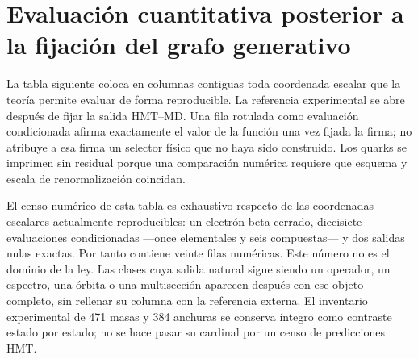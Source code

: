 \section{Evaluación cuantitativa posterior a la fijación del grafo generativo}
La tabla siguiente coloca en columnas contiguas toda coordenada escalar que la teoría permite evaluar de forma reproducible. La referencia experimental se abre después de fijar la salida HMT--MD. Una fila rotulada como evaluación condicionada afirma exactamente el valor de la función una vez fijada la firma; no atribuye a esa firma un selector físico que no haya sido construido. Los quarks se imprimen sin residual porque una comparación numérica requiere que esquema y escala de renormalización coincidan.

El censo numérico de esta tabla es exhaustivo respecto de las coordenadas escalares actualmente reproducibles: un electrón beta cerrado, diecisiete evaluaciones condicionadas ---once elementales y seis compuestas--- y dos salidas nulas exactas. Por tanto contiene veinte filas numéricas. Este número no es el dominio de la ley. Las clases cuya salida natural sigue siendo un operador, un espectro, una órbita o una multisección aparecen después con ese objeto completo, sin rellenar su columna con la referencia externa. El inventario experimental de 471 masas y 384 anchuras se conserva íntegro como contraste estado por estado; no se hace pasar su cardinal por un censo de predicciones HMT.

